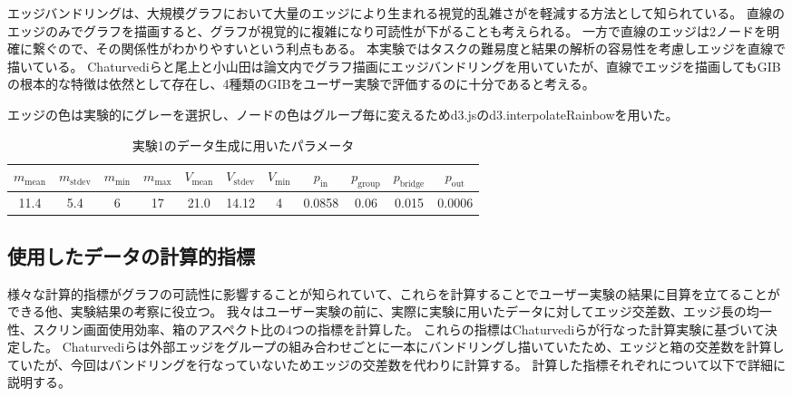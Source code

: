 \documentclass{kuee}
\begin{document}
エッジバンドリングは、大規模グラフにおいて大量のエッジにより生まれる視覚的乱雑さがを軽減する方法として知られている\cite{lhuillier2017state}。
直線のエッジのみでグラフを描画すると、グラフが視覚的に複雑になり可読性が下がることも考えられる。
一方で直線のエッジは2ノードを明確に繋ぐので、その関係性がわかりやすいという利点もある。
本実験ではタスクの難易度と結果の解析の容易性を考慮しエッジを直線で描いている。
Chaturvediら\cite{chaturvedi2014group}と尾上と小山田\cite{onoue2017optimal}は論文内でグラフ描画にエッジバンドリングを用いていたが、直線でエッジを描画してもGIBの根本的な特徴は依然として存在し、4種類のGIBをユーザー実験で評価するのに十分であると考える。

エッジの色は実験的にグレーを選択し、ノードの色はグループ毎に変えるためd3.js\cite{Bostock:2011:DDD:2068462.2068631}のd3.interpolateRainbowを用いた。


\begin{table}[b]
  \begin{center}
  \caption{実験1のデータ生成に用いたパラメータ}
  \label{tab:parameters}
  \begin{tabular}{|c|c|c|c|c|c|c|c|c|c|c|} \hline
  $m_{\text{mean}}$ & $m_{\text{stdev}}$ & $m_{\text{min}}$ & $m_{\text{max} }$ & $V_{\text{mean}}$ & $V_{\text{stdev}}$ & $V_{\text{min}}$ & $p_{\text{in}}$ & $p_{\text{group}}$ & $p_{\text{bridge}}$ & $p_{\text{out}}$ \\ \hline
  11.4 & 5.4 & 6 & 17 & 21.0 & 14.12 & 4 & 0.0858 & 0.06 & 0.015 & 0.0006\\ \hline
  \end{tabular}
  \end{center}
\end{table}

\subsection{使用したデータの計算的指標}
\label{subsec:metric_of_data}

様々な計算的指標がグラフの可読性に影響することが知られていて、これらを計算することでユーザー実験の結果に目算を立てることができる他、実験結果の考察に役立つ。
我々はユーザー実験の前に、実際に実験に用いたデータに対してエッジ交差数、エッジ長の均一性、スクリン画面使用効率、箱のアスペクト比の4つの指標を計算した。
これらの指標はChaturvediらが行なった計算実験\cite{chaturvedi2014group}に基づいて決定した。
Chaturvediらは外部エッジをグループの組み合わせごとに一本にバンドリングし描いていたため、エッジと箱の交差数を計算していたが、今回はバンドリングを行なっていないためエッジの交差数を代わりに計算する。
計算した指標それぞれについて以下で詳細に説明する。
\end{document}
